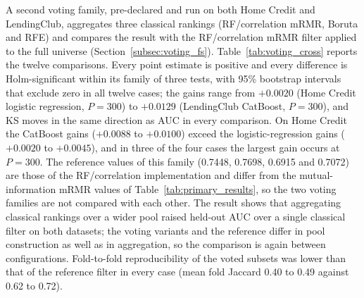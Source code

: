 \documentclass[final,5p,twocolumn]{elsarticle}
\begin{document}
A second voting family, pre-declared and run on both Home Credit and LendingClub, aggregates three classical rankings (RF/correlation mRMR, Boruta and RFE) and compares the result with the RF/correlation mRMR filter applied to the full universe (Section~\ref{subsec:voting_fs}). Table~\ref{tab:voting_cross} reports the twelve comparisons. Every point estimate is positive and every difference is Holm-significant within its family of three tests, with 95\% bootstrap intervals that exclude zero in all twelve cases; the gains range from $+0.0020$ (Home Credit logistic regression, $P=300$) to $+0.0129$ (LendingClub CatBoost, $P=300$), and KS moves in the same direction as AUC in every comparison. On Home Credit the CatBoost gains ($+0.0088$ to $+0.0100$) exceed the logistic-regression gains ($+0.0020$ to $+0.0045$), and in three of the four cases the largest gain occurs at $P=300$. The reference values of this family (0.7448, 0.7698, 0.6915 and 0.7072) are those of the RF/correlation implementation and differ from the mutual-information mRMR values of Table~\ref{tab:primary_results}, so the two voting families are not compared with each other. The result shows that aggregating classical rankings over a wider pool raised held-out AUC over a single classical filter on both datasets; the voting variants and the reference differ in pool construction as well as in aggregation, so the comparison is again between configurations. Fold-to-fold reproducibility of the voted subsets was lower than that of the reference filter in every case (mean fold Jaccard 0.40 to 0.49 against 0.62 to 0.72).
\end{document}
